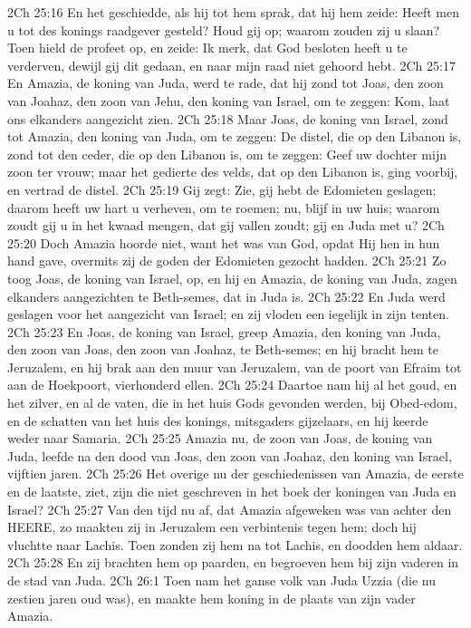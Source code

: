 2Ch 25:16  En het geschiedde, als hij tot hem sprak, dat hij hem zeide: Heeft men u tot des konings raadgever gesteld? Houd gij op; waarom zouden zij u slaan? Toen hield de profeet op, en zeide: Ik merk, dat God besloten heeft u te verderven, dewijl gij dit gedaan, en naar mijn raad niet gehoord hebt.
2Ch 25:17  En Amazia, de koning van Juda, werd te rade, dat hij zond tot Joas, den zoon van Joahaz, den zoon van Jehu, den koning van Israel, om te zeggen: Kom, laat ons elkanders aangezicht zien.
2Ch 25:18  Maar Joas, de koning van Israel, zond tot Amazia, den koning van Juda, om te zeggen: De distel, die op den Libanon is, zond tot den ceder, die op den Libanon is, om te zeggen: Geef uw dochter mijn zoon ter vrouw; maar het gedierte des velds, dat op den Libanon is, ging voorbij, en vertrad de distel.
2Ch 25:19  Gij zegt: Zie, gij hebt de Edomieten geslagen; daarom heeft uw hart u verheven, om te roemen; nu, blijf in uw huis; waarom zoudt gij u in het kwaad mengen, dat gij vallen zoudt; gij en Juda met u?
2Ch 25:20  Doch Amazia hoorde niet, want het was van God, opdat Hij hen in hun hand gave, overmits zij de goden der Edomieten gezocht hadden.
2Ch 25:21  Zo toog Joas, de koning van Israel, op, en hij en Amazia, de koning van Juda, zagen elkanders aangezichten te Beth-semes, dat in Juda is.
2Ch 25:22  En Juda werd geslagen voor het aangezicht van Israel; en zij vloden een iegelijk in zijn tenten.
2Ch 25:23  En Joas, de koning van Israel, greep Amazia, den koning van Juda, den zoon van Joas, den zoon van Joahaz, te Beth-semes; en hij bracht hem te Jeruzalem, en hij brak aan den muur van Jeruzalem, van de poort van Efraim tot aan de Hoekpoort, vierhonderd ellen.
2Ch 25:24  Daartoe nam hij al het goud, en het zilver, en al de vaten, die in het huis Gods gevonden werden, bij Obed-edom, en de schatten van het huis des konings, mitsgaders gijzelaars, en hij keerde weder naar Samaria.
2Ch 25:25  Amazia nu, de zoon van Joas, de koning van Juda, leefde na den dood van Joas, den zoon van Joahaz, den koning van Israel, vijftien jaren.
2Ch 25:26  Het overige nu der geschiedenissen van Amazia, de eerste en de laatste, ziet, zijn die niet geschreven in het boek der koningen van Juda en Israel?
2Ch 25:27  Van den tijd nu af, dat Amazia afgeweken was van achter den HEERE, zo maakten zij in Jeruzalem een verbintenis tegen hem; doch hij vluchtte naar Lachis. Toen zonden zij hem na tot Lachis, en doodden hem aldaar.
2Ch 25:28  En zij brachten hem op paarden, en begroeven hem bij zijn vaderen in de stad van Juda.
2Ch 26:1  Toen nam het ganse volk van Juda Uzzia (die nu zestien jaren oud was), en maakte hem koning in de plaats van zijn vader Amazia.
